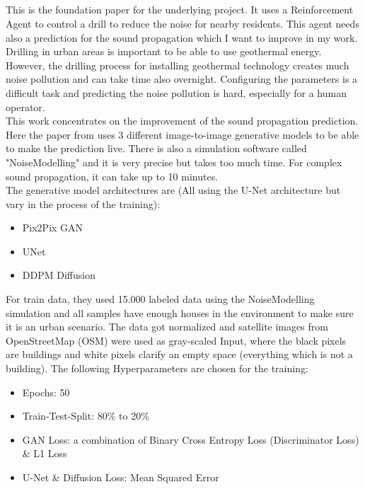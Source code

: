 		\subsection{}
			This is the foundation paper for the underlying project. It uses a Reinforcement Agent to control a drill to reduce the noise for nearby residents. This agent needs also a prediction for the sound propagation which I want to improve in my work.\\
			Drilling in urban areas is important to be able to use geothermal energy. However, the drilling process for installing geothermal technology creates much noise pollution and can take time also overnight. Configuring the parameters is a difficult task and predicting the noise pollution is hard, especially for a human operator.\\
			This work concentrates on the improvement of the sound propagation prediction. Here the paper from \citeauthor{ladwig_ai-guided_2024-1} uses 3 different image-to-image generative models to be able to make the prediction live. There is also a simulation software called "NoiseModelling" and it is very precise but takes too much time. For complex sound propagation, it can take up to 10 minutes.\\
			The generative model architectures are (All using the U-Net architecture but vary in the process of the training):
			\begin{itemize}[itemsep=1mm, parsep=0pt]
				\item Pix2Pix GAN
				\item UNet
				\item DDPM Diffusion
			\end{itemize}
			
			
			\newpage
			
			For train data, they used 15.000 labeled data using the NoiseModelling simulation and all samples have enough houses in the environment to make sure it is an urban scenario. The data got normalized and satellite images from OpenStreetMap (OSM) were used as gray-scaled Input, where the black pixels are buildings and white pixels clarify an empty space (everything which is not a building). The following Hyperparameters are chosen for the training:
			\begin{itemize}[itemsep=1mm, parsep=0pt]
				\item Epochs: 50
				\item Train-Test-Split: 80\% to 20\%
				\item GAN Loss: a combination of Binary Cross Entropy Loss (Discriminator Loss) \& L1 Loss
				\item U-Net \& Diffusion Loss: Mean Squared Error
			\end{itemize}
			
